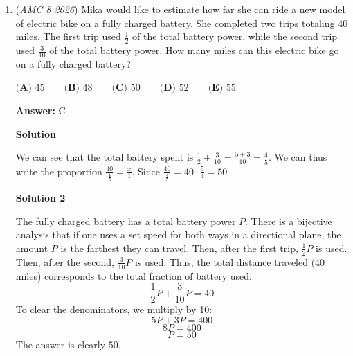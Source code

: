 \begin{enumerate}
We can first start off by finding the unreachable area. The problem tells us that the distance between the reachable and unreachable area is $1$, and since there are $2$, we get the dimensions of the unreachable to be $8 \cdot 6$, because $8 = 10 - 2$, and $6 = 8 - 2.$. Therefore, the area of the unreachable is $48$. However, the problem asks us to find the fraction of area he can reach, so we need to get area of the entire field and subtract by $48$.Since the entire field is $8 \cdot 10 = 80$,  we get $80 - 48 = 32$. So the area of the part Peter can reach is $32$. Finally, to convert this to a fraction of the entire field, we can do $\frac{32}{80}$, so our answer is $\frac{32}{80} = \boxed{ \textbf{(E) } \frac{2}{5} }$.

 To add on, its just like calculating the total area- the unwanted recangular area.

 


	\item (\textit{AMC 8 2026}) Mika would like to estimate how far she can ride a new model of electric bike on a fully charged battery. She completed two trips totaling $40$ miles. The first trip used $\frac{1}{2}$ of the total battery power, while the second trip used $\frac{3}{10}$ of the total battery power. How many miles can this electric bike go on a fully charged battery?


 $\textbf{(A) } 45\qquad\textbf{(B) } 48\qquad\textbf{(C) } 50\qquad\textbf{(D) } 52\qquad\textbf{(E) } 55\qquad$

 \textbf{Answer: }C



\textbf{Solution}

We can see that the total battery spent is $\frac{1}{2} + \frac{3}{10} = \frac{5+3}{10} = \frac{4}{5}$. We can thus write the proportion $\frac{40}{\frac{4}{5}} = \frac{x}{1}$. Since $\frac{40}{\frac{4}{5}} = 40\cdot \frac{5}{4} = \boxed{50}$




\textbf{Solution 2}

The fully charged battery has a total battery power $P$. There is a bijective analysis that if one uses a set speed for both ways in a directional plane, the amount $P$ is the farthest they can travel. Then, after the first trip, $\frac{1}{2}P$ is used. Then, after the second, $\frac{3}{10}P$ is used. Thus, the total distance traveled (40 miles) corresponds to the total fraction of battery used:
 \[\frac{1}{2}P + \frac{3}{10}P = 40\]To clear the denominators, we multiply by 10:
 \[5P + 3P = 400\]
 \[8P = 400\]
 \[P = 50\]The answer is clearly $\boxed{50}$.


\end{enumerate}
